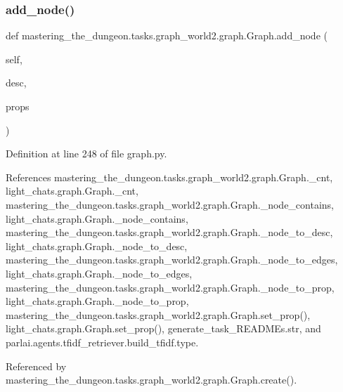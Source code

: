 \subsubsection{\texorpdfstring{add\+\_\+node()}{add\_node()}}
{\footnotesize\ttfamily def mastering\+\_\+the\+\_\+dungeon.\+tasks.\+graph\+\_\+world2.\+graph.\+Graph.\+add\+\_\+node (\begin{DoxyParamCaption}\item[{}]{self,  }\item[{}]{desc,  }\item[{}]{props }\end{DoxyParamCaption})}



Definition at line 248 of file graph.\+py.



References mastering\+\_\+the\+\_\+dungeon.\+tasks.\+graph\+\_\+world2.\+graph.\+Graph.\+\_\+cnt, light\+\_\+chats.\+graph.\+Graph.\+\_\+cnt, mastering\+\_\+the\+\_\+dungeon.\+tasks.\+graph\+\_\+world2.\+graph.\+Graph.\+\_\+node\+\_\+contains, light\+\_\+chats.\+graph.\+Graph.\+\_\+node\+\_\+contains, mastering\+\_\+the\+\_\+dungeon.\+tasks.\+graph\+\_\+world2.\+graph.\+Graph.\+\_\+node\+\_\+to\+\_\+desc, light\+\_\+chats.\+graph.\+Graph.\+\_\+node\+\_\+to\+\_\+desc, mastering\+\_\+the\+\_\+dungeon.\+tasks.\+graph\+\_\+world2.\+graph.\+Graph.\+\_\+node\+\_\+to\+\_\+edges, light\+\_\+chats.\+graph.\+Graph.\+\_\+node\+\_\+to\+\_\+edges, mastering\+\_\+the\+\_\+dungeon.\+tasks.\+graph\+\_\+world2.\+graph.\+Graph.\+\_\+node\+\_\+to\+\_\+prop, light\+\_\+chats.\+graph.\+Graph.\+\_\+node\+\_\+to\+\_\+prop, mastering\+\_\+the\+\_\+dungeon.\+tasks.\+graph\+\_\+world2.\+graph.\+Graph.\+set\+\_\+prop(), light\+\_\+chats.\+graph.\+Graph.\+set\+\_\+prop(), generate\+\_\+task\+\_\+\+R\+E\+A\+D\+M\+Es.\+str, and parlai.\+agents.\+tfidf\+\_\+retriever.\+build\+\_\+tfidf.\+type.



Referenced by mastering\+\_\+the\+\_\+dungeon.\+tasks.\+graph\+\_\+world2.\+graph.\+Graph.\+create().

